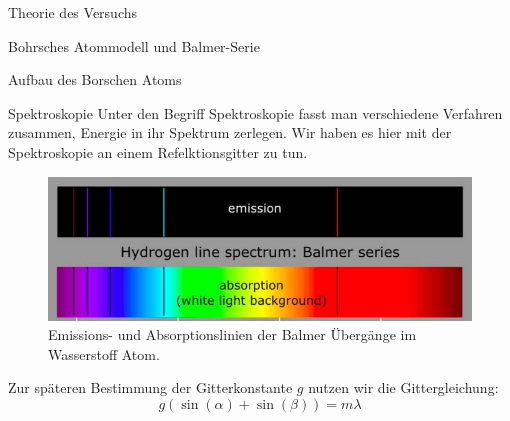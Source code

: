 \documentclass[pdftex, a4paper,11pt, twoside, ngerman]{report}
\begin{document}
\begin{chapter}{Theorie des Versuchs}
\begin{section}{Bohrsches Atommodell und Balmer-Serie}
\begin{subsection}{Aufbau des Borschen Atoms}
       
      \end{subsection}
     
     
     
      \begin{subsection}{Spektroskopie}
        \label{chp:TheorieBohrBalmerSerieSpektroskopie}
        Unter den Begriff Spektroskopie fasst man verschiedene Verfahren
        zusammen, Energie in ihr Spektrum zerlegen.
        Wir haben es hier mit der Spektroskopie an einem Refelktionsgitter zu
        tun.
        \begin{figure}[b]
          \begin{center}
            \includegraphics[width=.95\textwidth]
                {Figures/BalmerserieEmissionAbsorption.png}
            \caption{Emissions- und Absorptionslinien der Balmer Übergänge im
                Wasserstoff Atom.
                \cite{bib:BalmerserieEmissionAbsorption}}
            \label{fig:BalmerserieEmissionAbsorption}
          \end{center}
        \end{figure}
        Zur späteren Bestimmung der Gitterkonstante $g$ nutzen wir die
        Gittergleichung:
        \begin{equation}
          \label{eq:Gittergleichung}
          g(\sin(\alpha)+\sin(\beta))=m\lambda
        \end{equation}
       

\end{subsection}
\end{section}
\end{chapter}
\end{document}
